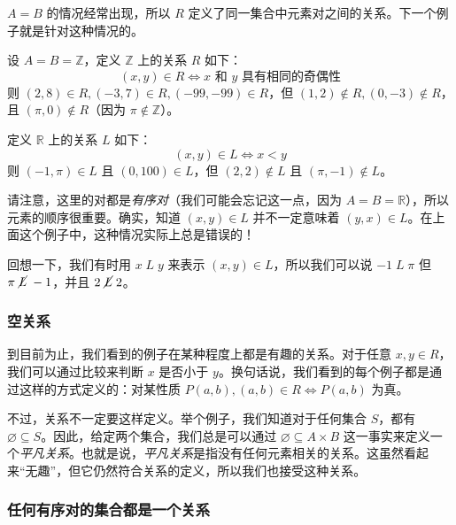 $A = B$ 的情况经常出现，所以 $R$ 定义了同一集合中元素对之间的关系。下一个例子就是针对这种情况的。\\

\begin{example} \label{ex:example6.2.5}
    设 $A=B=\mathbb{Z}$，定义 $\mathbb{Z}$ 上的关系 $R$ 如下：
    \[(x, y) \in R \iff x \text{ 和 } y \text{ 具有相同的奇偶性}\]
    则 $(2,8) \in R, (-3, 7) \in R, (-99, -99) \in R$，但 $(1,2) \notin R, (0, -3) \notin R$，且 $(\pi, 0) \notin R$（因为 $\pi \notin \mathbb{Z}$）。
\end{example}

\begin{example} \label{ex:example6.2.6}
    定义 $\mathbb{R}$ 上的关系 $L$ 如下：
    \[(x, y) \in L \iff x < y\]
    则 $(-1, \pi) \in L$ 且 $(0, 100) \in L$，但 $(2, 2) \notin L$ 且 $(\pi, -1) \notin L$。
\end{example}

请注意，这里的对都是\emph{有序对}（我们可能会忘记这一点，因为 $A = B = \mathbb{R}$），所以元素的顺序很重要。确实，知道 $(x, y) \in L$ 并不一定意味着 $(y, x) \in L$。在上面这个例子中，这种情况实际上总是错误的！

回想一下，我们有时用 $x \;L\; y$ 来表示 $(x, y) \in L$，所以我们可以说 $-1 \;L\; \pi$ 但 $\pi \;\cancel{L}\; -1$，并且 $2 \;\cancel{L}\; 2$。

\subsubsection*{空关系}

\begin{remark}
    到目前为止，我们看到的例子在某种程度上都是有趣的关系。对于任意 $x,y \in R$，我们可以通过比较来判断 $x$ 是否小于 $y$。换句话说，我们看到的每个例子都是通过这样的方式定义的：对某性质 $P(a, b), (a, b) \in R \iff P(a, b)$ 为真。
\end{remark}

不过，关系不一定要这样定义。举个例子，我们知道对于任何集合 $S$，都有 $\varnothing \subseteq S$。因此，给定两个集合，我们总是可以通过 $\varnothing \subseteq A \times B$ 这一事实来定义一个\emph{平凡关系}。也就是说，\emph{平凡关系}是指没有任何元素相关的关系。这虽然看起来``无趣''，但它仍然符合关系的定义，所以我们也接受这种关系。

\subsubsection*{任何有序对的集合都是一个关系}

